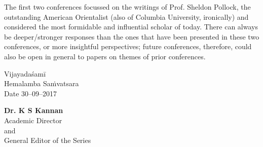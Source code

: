 The first two conferences focussed on the writings of Prof. Sheldon Pollock, the outstanding American Orientalist (also of Columbia University, ironically) and considered the most formidable and influential scholar of today. There can always be deeper/stronger responses than the ones that have been presented in these two conferences, or more insightful perspectives; future conferences, therefore, could also be open in general to papers on themes of prior conferences.

 Vijayadaśamī\\
 Hemalamba Saṁvatsara\\
 Date 30–09–2017\\

\begin{flushright}
 \textbf{Dr. K S Kannan}\\
 Academic Director\\
 and\\
 General Editor of the Series
\end{flushright}

